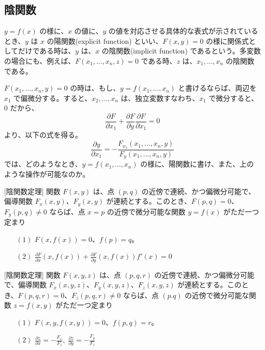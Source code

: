 \subsection{陰関数}
$y = f(x)$ の様に、$x$ の値に、$y$ の値を対応させる具体的な表式が示されているとき、$y$ は $x$ の陽関数(explicit function)  といい、$F(x,y) = 0$ の様に関係式としてだけである時は、$y$ は、$x$ の陰関数(implicit function) であるという。多変数の場合にも、例えば、$F(x_1,\ldots, x_n,z) = 0$ である時、$z$ は、$x_1,\ldots, x_n$ の陰関数である。

\medskip
$F(x_1,\ldots, x_n,y) = 0$ の時は、もし、$y = f(x_1,\ldots, x_n)$ と書けるならば、両辺を $x_1$ で偏微分する。すると、$x_2, \ldots, x_n$ は、独立変数すなわち、$x_1$ で微分すると、$0$ だから、　
$$\frac{\partial F}{\partial x_1} + \frac{\partial F}{\partial y}\frac{\partial F}{\partial x_1} = 0$$
より、以下の式を得る。
$$\frac{\partial y}{\partial x_1} = -\frac{F_{x_1}(x_1,\ldots,x_n,y)}{F_y(x_1,\ldots,x_n,y)}$$
では、どのようなとき、$y = f(x_1,\ldots, x_n)$ の様に、陽関数に書け、また、上のような操作が可能なのか。

\begin{thm} {\rm [陰関数定理]}\label{thm:implicit}
関数 $F(x,y)$ は、点 $(p,q)$ の近傍で連続、かつ偏微分可能で、偏導関数 $F_x(x,y)$、$F_y(x,y)$ が連続とする。このとき、$F(p,q) = 0$、$F_y(p,q) \neq 0$ ならば、点 $x = p$ の近傍で微分可能な関数 $y = f(x)$ がただ一つ定まり
\begin{itemize}
\item[$(1)$] $F(x,f(x)) = 0$、$f(p) = q$。
\item[$(2)$] ${\displaystyle \frac{\partial F}{\partial x}(x,f(x)) + \frac{\partial F}{\partial y}(x,f(x))f'(x) = 0}$
\end{itemize}
\end{thm}

\begin{thm} {\rm [陰関数定理]}\label{thm:implicit3}
関数 $F(x,y,z)$ は、点 $(p,q,r)$ の近傍で連続、かつ偏微分可能で、偏導関数 $F_x(x,y,z)$、$F_y(x,y,z)$、$F_z(x,y,z)$ が連続とする。このとき、$F(p,q,r) = 0$、$F_z(p,q,r) \neq 0$ ならば、点 $(p.q)$ の近傍で微分可能な関数 $z = f(x,y)$ がただ一つ定まり
\begin{itemize}
\item[$(1)$] $F(x,y,f(x,y)) = 0$、$f(p,q) = r$。
\item[$(2)$] ${\displaystyle \frac{\partial z}{\partial x} = - \frac{F_x}{F_z}, \;\frac{\partial z}{\partial y} = - \frac{F_y}{F_z}}$
\end{itemize}
\end{thm}

